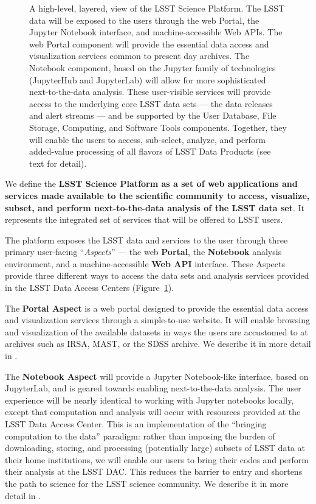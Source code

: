\begin{figure}
\centering
{}
\caption{
A high-level, layered, view of the LSST Science Platform.  The LSST data
will be exposed to the users through the web Portal, the Jupyter Notebook
interface, and machine-accessible Web APIs.  The web Portal component will
provide the essential data access and visualization services common to
present day archives.  The Notebook component, based on the Jupyter family
of technologies (JupyterHub and JupyterLab) will allow for more
sophisticated next-to-the-data analysis.  These user-visible services will
provide access to the underlying core LSST data sets --- the data releases and
alert streams --- and be supported by the User Database, File Storage,
Computing, and Software Tools components.  Together, they will enable the
users to access, sub-select, analyze, and perform added-value processing of
all flavors of LSST Data Products (see text for detail).
\label{fig:layeredLSP}}
\end{figure}

We define the \textbf{LSST Science Platform as a set of web applications and services
made available to the scientific community to access, visualize, subset, and
perform next-to-the-data analysis of the LSST data set}. It represents the integrated
set of services that will be offered to LSST users.

The platform exposes the LSST data
and services to the user through three primary user-facing ``\textit{Aspects}'' --- the web \textbf{Portal},
the \textbf{Notebook} analysis environment, and a machine-accessible \textbf{Web API} interface.
These Aspects provide three different ways to access the data sets and analysis services provided in the LSST Data Access Centers (Figure~\ref{fig:layeredLSP}).

The \textbf{Portal Aspect} is a web portal designed to provide the essential data
access and visualization services through a simple-to-use website.  It will
enable browsing and visualization of the available datasets in ways the
users are accustomed to at archives such as IRSA, MAST, or the SDSS archive.
We describe it in more detail in .

The \textbf{Notebook Aspect} will provide a Jupyter Notebook-like interface,
based on JupyterLab, and is geared towards enabling next-to-the-data analysis.
The user experience will
be nearly identical to working with Jupyter notebooks locally, except that computation
and analysis will occur with resources provided at the LSST Data Access Center.
This is an
implementation of the ``bringing computation to the data'' paradigm: rather
than imposing the burden of downloading, storing, and processing (potentially large)
subsets of LSST data at their home institutions, we will enable our users to
bring their codes and perform their analysis at the LSST DAC.
This reduces the barrier to entry and shortens the path to science for
the LSST science community. We describe it in more detail in .

